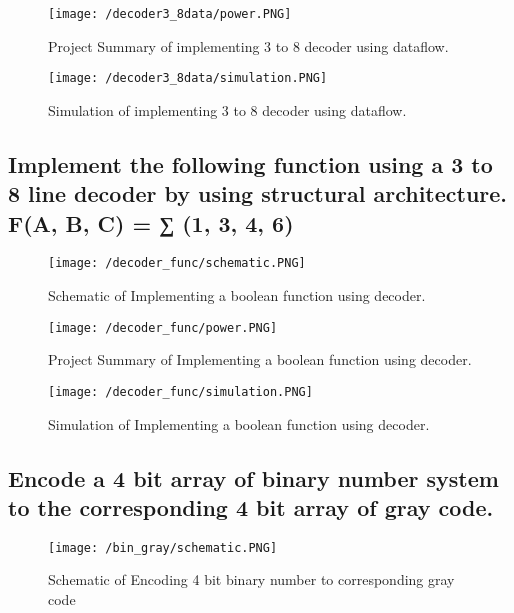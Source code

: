 \begin{figure}[h!]
\centering
\texttt{[image: /decoder3\_8data/power.PNG]}
\caption{Project Summary of implementing 3 to 8 decoder using dataflow.}
\label{figure:2}


\end{figure}


\begin{figure}[h!]
\centering
\texttt{[image: /decoder3\_8data/simulation.PNG]}
\caption{Simulation of implementing 3 to 8 decoder using dataflow.}
\label{figure:3}
\end{figure}

\FloatBarrier 

\clearpage
\subsection{Implement the following function using a 3 to 8 line decoder by using structural architecture.\\
F(A, B, C) = ∑ (1, 3, 4, 6) }
\begin{figure}[h!]
\centering
\texttt{[image: /decoder\_func/schematic.PNG]}
\caption{Schematic of Implementing a boolean function using decoder.}
\label{figure:1}
\end{figure}


\begin{figure}[h!]
\centering
\texttt{[image: /decoder\_func/power.PNG]}
\caption{Project Summary of Implementing a boolean function using decoder.}
\label{figure:2}


\end{figure}


\begin{figure}[h!]
\centering
\texttt{[image: /decoder\_func/simulation.PNG]}
\caption{Simulation of Implementing a boolean function using decoder.}
\label{figure:3}
\end{figure}


\FloatBarrier   \clearpage

\subsection{Encode a 4 bit array of binary number system to the corresponding 4 bit array of gray code. }
\begin{figure}[h!]
\centering
\texttt{[image: /bin\_gray/schematic.PNG]}
\caption{Schematic of Encoding 4 bit binary number to corresponding gray code}
\label{figure:1}
\end{figure}



